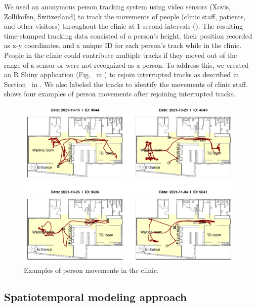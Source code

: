 \documentclass[fleqn,11pt]{wlscirep}
\begin{document}
We used an anonymous person tracking system using video sensors (Xovis, Zollikofen, Switzerland) to track the movements of people (clinic staff, patients, and other visitors) throughout the clinic at 1-second intervals (). The resulting time-stamped tracking data consisted of a person’s height, their position recorded as x-y coordinates, and a unique ID for each person's track while in the clinic. People in the clinic could contribute multiple tracks if they moved out of the range of a sensor or were not recognized as a person. To address this, we created an R Shiny application (Fig.~ in \supp) to rejoin interrupted tracks as described in Section~ in \supp. We also labeled the tracks to identify the movements of clinic staff.  shows four examples of person movements after rejoining interrupted tracks.  

\begin{figure}[!htpb]
    \centering
    \includegraphics{results/data/example-patient-tracks.png}
    \caption{Examples of person movements in the clinic.}
    \label{fig:tracking-examples}
\end{figure}


\subsection*{Spatiotemporal modeling approach}
\end{document}
